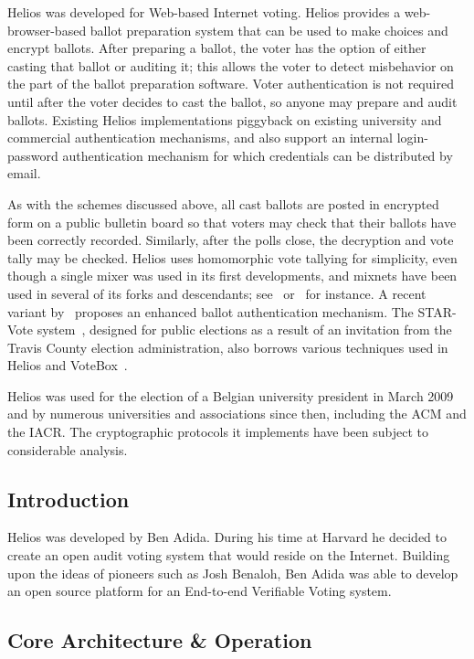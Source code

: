 Helios was developed for Web-based Internet voting. Helios provides a
web-browser-based ballot preparation system that can be used to make
choices and encrypt ballots.  After preparing a ballot, the voter has
the option of either casting that ballot or auditing it; this allows
the voter to detect misbehavior on the part of the ballot preparation
software. Voter authentication is not required until after the voter
decides to cast the ballot, so anyone may prepare and audit ballots.
Existing Helios implementations piggyback on existing university and
commercial authentication mechanisms, and also support an internal
login-password authentication mechanism for which credentials can be
distributed by email.

As with the schemes discussed above, all cast ballots are posted in
encrypted form on a public bulletin board so that voters may check
that their ballots have been correctly recorded.  Similarly, after the
polls close, the decryption and vote tally may be checked. Helios uses
homomorphic vote tallying for simplicity, even though a single mixer
was used in its first developments, and mixnets have been used in
several of its forks and descendants; see~\cite{bulens2011}
or~\cite{tsoukalas2013} for instance. A recent variant
by~\cite{cortier2014} proposes an enhanced ballot authentication
mechanism. The STAR-Vote system~\cite{star-vote}, designed for public
elections as a result of an invitation from the Travis County election
administration, also borrows various techniques used in Helios and
VoteBox~\cite{sandler2008}.

Helios was used for the election of a Belgian university president in
March 2009 and by numerous universities and associations since then,
including the ACM and the IACR. The cryptographic protocols it
implements have been subject to considerable analysis.


\subsection{Introduction}

Helios was developed by Ben Adida. During his time at Harvard he
decided to create an open audit voting system that would reside on the
Internet. Building upon the ideas of pioneers such as Josh Benaloh,
Ben Adida was able to develop an open source platform for an
End-to-end Verifiable Voting system.

\subsection{Core Architecture \& Operation}

